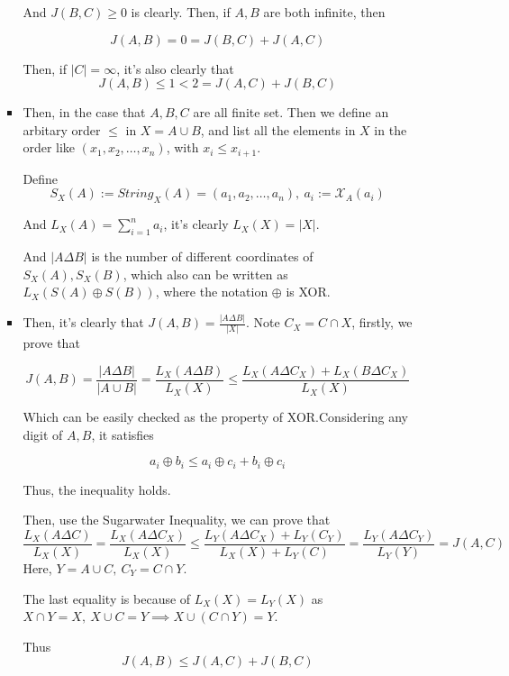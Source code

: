 \documentclass{article}
\begin{document}
\begin{enumerate}
\begin{enumerate}
\begin{itemize}
            And \(J(B, C) \ge 0\) is clearly. Then, if \(A, B\) are both infinite, then 
            
            \[J(A, B) = 0 = J(B, C) + J(A, C)\]
    
            Then, if \(|C| = \infty\), it's also clearly that
            \[J(A, B) \le 1 < 2 = J(A, C) + J(B, C)\]
            \item 
            Then, in the case that \(A, B, C\) are all finite set. Then we define an arbitary order \(\le\) in \(X = A \cup B\), and list all the elements in \(X\) in the order like \((x_1, x_2, \ldots, x_n)\), with \(x_i \le x_{i + 1}\). 

            Define 
            \[S_X(A) := String_X(A) = (a_1, a_2, \ldots, a_n),\ a_i := \mathcal X_{A} (a_i)\]

            And \(L_X(A) = \sum_{i = 1}^n a_i\), it's clearly \(L_X(X) = |X|\). 

            And \(|A \Delta B|\) is the number of different coordinates of \(S_X(A), S_X(B)\), which also can be written as \(L_X(S(A) \oplus S(B))\), where the notation \(\oplus\) is XOR.
            \item 
            Then, it's clearly that \(J(A, B) = \frac{|A \Delta B|}{|X|}\). Note \(C_X = C \cap X\), firstly, we prove that

            \[J(A, B) = \frac{|A \Delta B|}{|A \cup B|} = \frac{L_X(A \Delta B)}{L_X(X)} \le \frac{L_X(A \Delta C_X) + L_X(B \Delta C_X)}{L_X(X)}\]

            Which can be easily checked as the property of XOR.\@ Considering any digit of \(A, B\), it satisfies

            \[a_i \oplus b_i \le a_i \oplus c_i + b_i \oplus c_i\]

            Thus, the inequality holds.
    
            Then, use the Sugarwater Inequality, we can prove that
            \[\frac{L_{X}(A \Delta C)}{L_X(X)} = \frac{L_X(A \Delta C_X)}{L_X(X)} \le \frac{L_Y(A \Delta C_X) + L_Y(C_Y)}{L_X(X) + L_Y(C)} = \frac{L_Y(A \Delta C_Y)}{L_Y(Y)} = J(A, C)\]
            Here, \(Y = A \cup C,\ C_Y = C \cap Y\). 
            
            The last equality is because of \(L_X(X) = L_Y(X)\) as \(X \cap Y = X,\ X \cup C = Y \implies X \cup (C \cap Y) = Y\).

            Thus 
            \[J(A, B) \le J(A, C) + J(B, C)\]
        \end{itemize}
        

\end{enumerate}
\end{enumerate}
\end{document}

